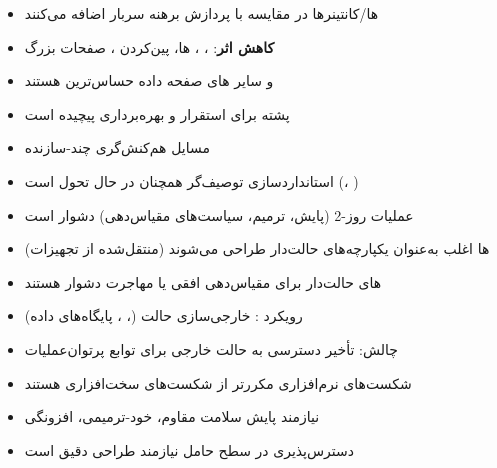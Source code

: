

\CNchained{}

\begin{itemize}
\tightlist
\item
  ها/\allowbreak{}کانتینرها در مقایسه با پردازش  برهنه سربار اضافه می‌کنند
\item
  \textbf{کاهش اثر}: ، ، ها، پین‌کردن ، صفحات بزرگ
\item
   و سایر های صفحه داده حساس‌ترین هستند
\end{itemize}


\begin{itemize}
\tightlist
\item
  پشته  برای استقرار و بهره‌برداری پیچیده است
\item
  مسایل هم‌کنش‌گری  چند-سازنده
\item
  استانداردسازی توصیف‌گر همچنان در حال تحول است (، )
\item
  عملیات روز-2 (پایش، ترمیم، سیاست‌های مقیاس‌دهی) دشوار است
\end{itemize}


\begin{itemize}
\tightlist
\item
  ها اغلب به‌عنوان یکپارچه‌های حالت‌دار طراحی می‌شوند (منتقل‌شده از تجهیزات)
\item
  های حالت‌دار برای مقیاس‌دهی افقی یا مهاجرت دشوار هستند
\item
  رویکرد : خارجی‌سازی حالت (، ، پایگاه‌های داده)
\item
  چالش: تأخیر دسترسی به حالت خارجی برای توابع پرتوان‌عملیات
\end{itemize}


\begin{itemize}
\tightlist
\item
  شکست‌های نرم‌افزاری مکررتر از شکست‌های سخت‌افزاری هستند
\item
  نیازمند پایش سلامت مقاوم، خود-ترمیمی، افزونگی
\item
  دسترس‌پذیری در سطح حامل  نیازمند طراحی دقیق است
\end{itemize}


